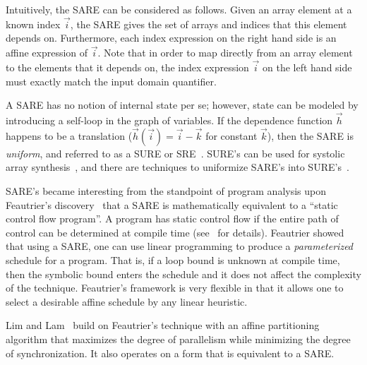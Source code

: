 Intuitively, the SARE can be considered as follows.  Given an array
element at a known index $\vec i$, the SARE gives the set of arrays
and indices that this element depends on.  Furthermore, each index
expression on the right hand side is an affine expression of $\vec i$.
Note that in order to map directly from an array element to the
elements that it depends on, the index expression $\vec i$ on the left
hand side must exactly match the input domain quantifier.

A SARE has no notion of internal state per se; however, state can be
modeled by introducing a self-loop in the graph of variables.  If the
dependence function ${\vec h}$ happens to be a translation (${\vec
h}({\vec i}) = {\vec i} - {\vec k}$ for constant ${\vec k}$), then the
SARE is {\it uniform}, and referred to as a SURE or
SRE~\cite{Karp67}. SURE's can be used for systolic array
synthesis~\cite{Quinton84}, and there are techniques to uniformize
SARE's into SURE's~\cite{Manjun00}.

SARE's became interesting from the standpoint of program analysis upon
Feautrier's discovery~\cite{Feautrier92i,Feautrier92ii} that a SARE is
mathematically equivalent to a ``static control flow program''.  A
program has static control flow if the entire path of control can be
determined at compile time (see~\cite{Feautrier92i,DRV00} for
details).  Feautrier showed that using a SARE, one can use linear
programming to produce a {\it parameterized} schedule for a program.
That is, if a loop bound is unknown at compile time, then the symbolic
bound enters the schedule and it does not affect the complexity of the
technique.  Feautrier's framework is very flexible in that it allows
one to select a desirable affine schedule by any linear heuristic.

Lim and Lam~\cite{Lim01} build on Feautrier's technique with an affine
partitioning algorithm that maximizes the degree of parallelism while
minimizing the degree of synchronization.  It also operates on a form
that is equivalent to a SARE.
